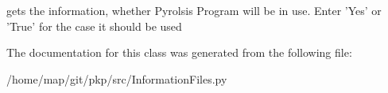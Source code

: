 \begin{DoxyVerb}gets the information, whether Pyrolsis Program will be in use. Enter 'Yes' or 'True' for the case it should be used\end{DoxyVerb}
 

\-The documentation for this class was generated from the following file\-:\begin{DoxyCompactItemize}
\item 
/home/map/git/pkp/src/\-Information\-Files.\-py\end{DoxyCompactItemize}
